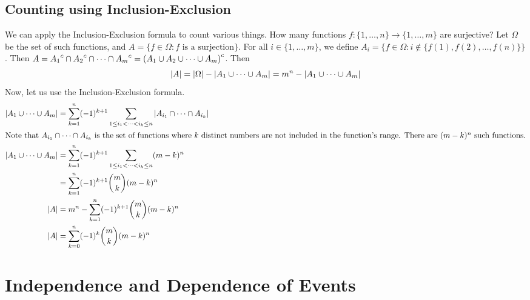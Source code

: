 \documentclass{article}
\begin{document}
\subsection{Counting using Inclusion-Exclusion}
We can apply the Inclusion-Exclusion formula to count various things. How many functions $f \colon \{ 1, \dots, n \} \to \{ 1, \dots, m \}$ are surjective? Let $\Omega$ be the set of such functions, and $A = \{ f \in \Omega : f \text{ is a surjection} \}$. For all $i \in \{ 1, \dots, m \}$, we define $A_i = \{ f \in \Omega : i \notin \{ f(1), f(2), \dots, f(n) \} \}$. Then $A = {A_1}^c \cap {A_2}^c \cap \dots \cap {A_m}^c = {(A_1 \cup A_2 \cup \dots \cup A_m)}^c$. Then
\[ \abs{A} = \abs{\Omega} - \abs{A_1 \cup \dots \cup A_m} = m^n - \abs{A_1 \cup \dots \cup A_m} \]
Now, let us use the Inclusion-Exclusion formula.
\begin{align*}
    \abs{A_1 \cup \dots \cup A_m} & = \sum_{k=1}^n (-1)^{k+1} \sum_{1 \leq i_1 < \dots < i_k \leq n} \abs{A_{i_1} \cap \dots \cap A_{i_k}} \\
    \intertext{Note that $A_{i_1} \cap \dots \cap A_{i_k}$ is the set of functions where $k$ distinct numbers are not included in the function's range. There are $(m-k)^n$ such functions.}
    \abs{A_1 \cup \dots \cup A_m} & = \sum_{k=1}^n (-1)^{k+1} \sum_{1 \leq i_1 < \dots < i_k \leq n} (m-k)^n                               \\
                                  & = \sum_{k=1}^n (-1)^{k+1} \binom{m}{k} (m-k)^n                                                         \\
    \abs{A}                       & = m^n -  \sum_{k=1}^n (-1)^{k+1} \binom{m}{k} (m-k)^n                                                  \\
    \abs{A}                       & = \sum_{k=0}^n (-1)^k \binom{m}{k} (m-k)^n
\end{align*}

\section{Independence and Dependence of Events}
\end{document}
